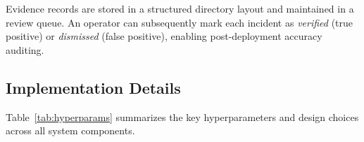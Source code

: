 \documentclass[11pt,a4paper]{article}
\begin{document}
Evidence records are stored in a structured directory layout and maintained in a review queue. An operator can subsequently mark each incident as \textit{verified} (true positive) or \textit{dismissed} (false positive), enabling post-deployment accuracy auditing.


\subsection{Implementation Details}
\label{subsec:implementation}

Table~\ref{tab:hyperparams} summarizes the key hyperparameters and design choices across all system components.
\end{document}
